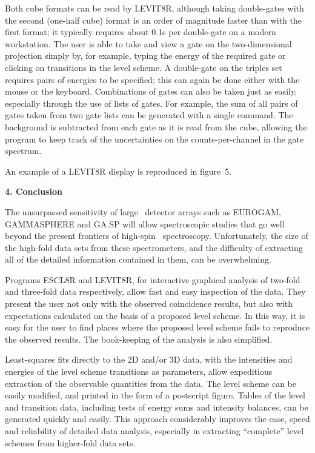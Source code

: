 Both cube formats can be read by LEVIT8R, although taking double-gates with the
second (one-half cube) format is an order of magnitude faster than with the
first format; it typically requires about 0.1s per double-gate on a modern
workstation. The user is able to take and view a gate on the two-dimensional
projection simply by, for example, typing the energy of the required gate or
clicking on transitions in the level scheme. A double-gate on the triples set
requires pairs of energies to be specified; this can again be done either with
the mouse or the keyboard. Combinations of gates can also be taken just as
easily, especially through the use of lists of gates. For example, the sum of
all pairs of gates taken from two gate lists can be generated with a single
command. The background is subtracted from each gate as it is read from the
cube, allowing the program to keep track of the uncertainties on the
counts-per-channel in the gate spectrum. 

An example of a LEVIT8R display is reproduced in figure~5.


\begin{center}
{\bf                              4. Conclusion}
\end{center}

The unsurpassed sensitivity of large \ghray\ detector arrays such as EUROGAM,
GAMMASPHERE and GA.SP will allow spectroscopic studies that go well beyond the
present frontiers of high-spin \ghray\ spectroscopy. Unfortunately, the size of
the high-fold data sets from these spectrometers, and the difficulty of
extracting all of the detailed information contained in them, can be
overwhelming.

Programs ESCL8R and LEVIT8R, for interactive graphical analysis of two-fold and
three-fold data respectively, allow fast and easy inspection of the data. They
present the user not only with the observed coincidence results, but also with
expectations calculated on the basis of a proposed level scheme. In this way,
it is easy for the user to find places where the proposed level scheme fails to
reproduce the observed results. The book-keeping of the analysis
is also simplified.

Least-squares fits directly to the 2D and/or 3D data, with the intensities and
energies of the level scheme transitions as parameters, allow expeditious
extraction of the observable quantities from the data. The level scheme can
be easily modified, and printed in the form of a postscript figure. Tables of
the level and transition data, including tests of energy sums and intensity
balances, can be generated quickly and easily. This approach considerably
improves the ease, speed and reliability of detailed data analysis, especially
in extracting ``complete'' level schemes from higher-fold data sets.

